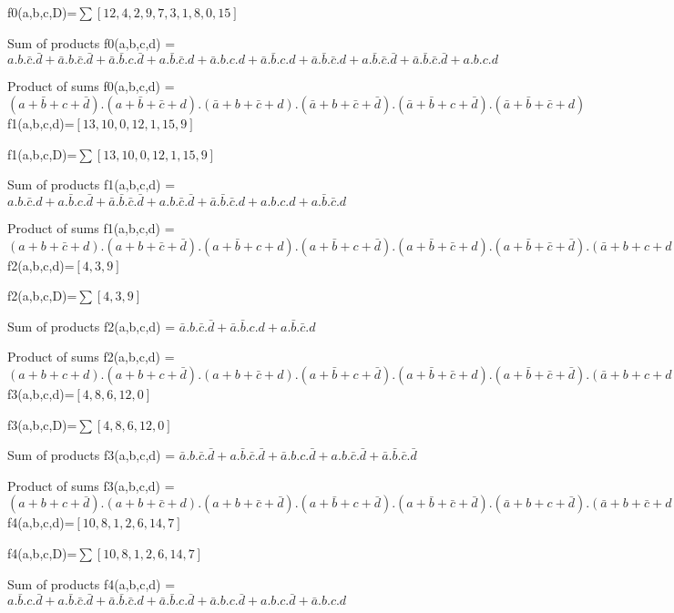 f0(a,b,c,D)=$ \sum [12, 4, 2, 9, 7, 3, 1, 8, 0, 15] $ 


Sum of products 
 f0(a,b,c,d) = $a.b.\bar c.\bar d + \bar a.b.\bar c.\bar d + \bar a.\bar b.c.\bar d + a.\bar b.\bar c.d + \bar a.b.c.d + \bar a.\bar b.c.d + \bar a.\bar b.\bar c.d + a.\bar b.\bar c.\bar d + \bar a.\bar b.\bar c.\bar d + a.b.c.d$

Product of sums 
 f0(a,b,c,d) = $(a+\bar b+c+\bar d) . (a+\bar b+\bar c+d) . (\bar a+b+\bar c+d) . (\bar a+b+\bar c+\bar d) . (\bar a+\bar b+c+\bar d) . (\bar a+\bar b+\bar c+d)$
f1(a,b,c,d)=$[13, 10, 0, 12, 1, 15, 9]$

f1(a,b,c,D)=$ \sum [13, 10, 0, 12, 1, 15, 9] $ 


Sum of products 
 f1(a,b,c,d) = $a.b.\bar c.d + a.\bar b.c.\bar d + \bar a.\bar b.\bar c.\bar d + a.b.\bar c.\bar d + \bar a.\bar b.\bar c.d + a.b.c.d + a.\bar b.\bar c.d$

Product of sums 
 f1(a,b,c,d) = $(a+b+\bar c+d) . (a+b+\bar c+\bar d) . (a+\bar b+c+d) . (a+\bar b+c+\bar d) . (a+\bar b+\bar c+d) . (a+\bar b+\bar c+\bar d) . (\bar a+b+c+d) . (\bar a+b+\bar c+\bar d) . (\bar a+\bar b+\bar c+d)$
f2(a,b,c,d)=$[4, 3, 9]$

f2(a,b,c,D)=$ \sum [4, 3, 9] $ 


Sum of products 
 f2(a,b,c,d) = $\bar a.b.\bar c.\bar d + \bar a.\bar b.c.d + a.\bar b.\bar c.d$

Product of sums 
 f2(a,b,c,d) = $(a+b+c+d) . (a+b+c+\bar d) . (a+b+\bar c+d) . (a+\bar b+c+\bar d) . (a+\bar b+\bar c+d) . (a+\bar b+\bar c+\bar d) . (\bar a+b+c+d) . (\bar a+b+\bar c+d) . (\bar a+b+\bar c+\bar d) . (\bar a+\bar b+c+d) . (\bar a+\bar b+c+\bar d) . (\bar a+\bar b+\bar c+d) . (\bar a+\bar b+\bar c+\bar d)$
f3(a,b,c,d)=$[4, 8, 6, 12, 0]$

f3(a,b,c,D)=$ \sum [4, 8, 6, 12, 0] $ 


Sum of products 
 f3(a,b,c,d) = $\bar a.b.\bar c.\bar d + a.\bar b.\bar c.\bar d + \bar a.b.c.\bar d + a.b.\bar c.\bar d + \bar a.\bar b.\bar c.\bar d$

Product of sums 
 f3(a,b,c,d) = $(a+b+c+\bar d) . (a+b+\bar c+d) . (a+b+\bar c+\bar d) . (a+\bar b+c+\bar d) . (a+\bar b+\bar c+\bar d) . (\bar a+b+c+\bar d) . (\bar a+b+\bar c+d) . (\bar a+b+\bar c+\bar d) . (\bar a+\bar b+c+\bar d) . (\bar a+\bar b+\bar c+d) . (\bar a+\bar b+\bar c+\bar d)$
f4(a,b,c,d)=$[10, 8, 1, 2, 6, 14, 7]$

f4(a,b,c,D)=$ \sum [10, 8, 1, 2, 6, 14, 7] $ 


Sum of products 
 f4(a,b,c,d) = $a.\bar b.c.\bar d + a.\bar b.\bar c.\bar d + \bar a.\bar b.\bar c.d + \bar a.\bar b.c.\bar d + \bar a.b.c.\bar d + a.b.c.\bar d + \bar a.b.c.d$

